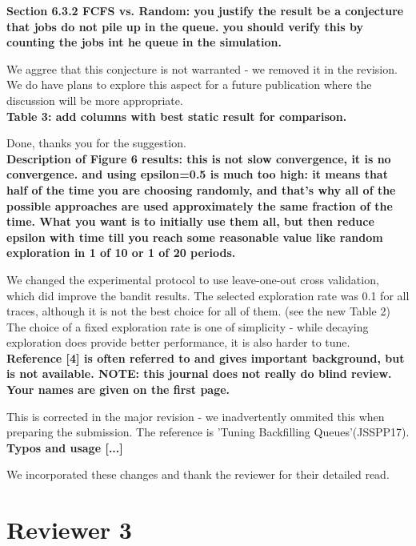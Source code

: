 \documentclass[]{article}
\begin{document}
  \textbf{Section 6.3.2 FCFS vs. Random: you justify the result be a conjecture that jobs do not pile up in the queue.  you should verify this by counting the jobs int he queue in the simulation.}

We aggree that this conjecture is not warranted - we removed it in the revision.
We do have plans to explore this aspect for a future publication where the
discussion will be more appropriate.\\

\textbf{Table 3: add columns with best static result for comparison.}

Done, thanks you for the suggestion.\\

\textbf{Description of Figure 6 results: this is not slow convergence, it is no
convergence.  and using epsilon=0.5 is much too high: it means that half of the
time you are choosing randomly, and that's why all of the possible approaches
are used approximately the same fraction of the time. What you want is to
initially use them all, but then reduce epsilon with time till you reach some
reasonable value like random exploration in 1 of 10 or 1 of 20 periods.}

We changed the experimental protocol to use leave-one-out cross validation,
which did improve the bandit results. The selected exploration rate was 0.1 for
all traces, although it is not the best choice for all of them. (see the new
Table 2) The choice of a fixed exploration rate is one of simplicity - while
decaying exploration does provide better performance, it is also harder to
tune.\\

\textbf{Reference [4] is often referred to and gives important background, but
is not available. NOTE: this journal does not really do blind review. Your
names are given on the first page.}

This is corrected in the major revision - we inadvertently ommited this
when preparing the submission. The reference is 'Tuning Backfilling Queues'(JSSPP17).\\

\textbf{Typos and usage [...]}

We incorporated these changes and thank the reviewer for their detailed read.\\

\section{Reviewer 3}
\end{document}
